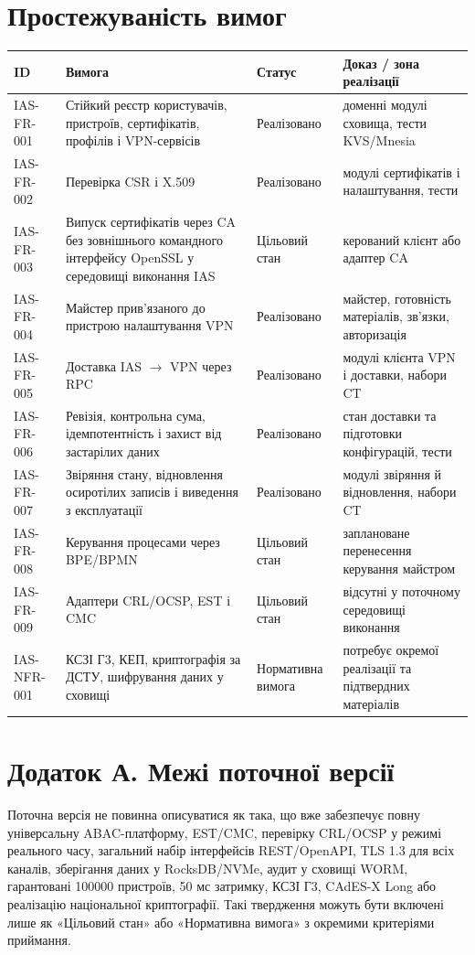 \documentclass{article}
\begin{document}
\section{Простежуваність вимог}
\begin{longtable}{p{2.3cm}p{5.4cm}p{2.2cm}p{4.1cm}}
\toprule
\textbf{ID} & \textbf{Вимога} & \textbf{Статус} & \textbf{Доказ / зона реалізації} \\
\midrule
IAS-FR-001 & Стійкий реєстр користувачів, пристроїв, сертифікатів, профілів і VPN-сервісів & Реалізовано & доменні модулі сховища, тести KVS/Mnesia \\
IAS-FR-002 & Перевірка CSR і X.509 & Реалізовано & модулі сертифікатів і налаштування, тести \\
IAS-FR-003 & Випуск сертифікатів через CA без зовнішнього командного інтерфейсу OpenSSL у середовищі виконання IAS & Цільовий стан & керований клієнт або адаптер CA \\
IAS-FR-004 & Майстер прив’язаного до пристрою налаштування VPN & Реалізовано & майстер, готовність матеріалів, зв’язки, авторизація \\
IAS-FR-005 & Доставка IAS $\rightarrow$ VPN через RPC & Реалізовано & модулі клієнта VPN і доставки, набори CT \\
IAS-FR-006 & Ревізія, контрольна сума, ідемпотентність і захист від застарілих даних & Реалізовано & стан доставки та підготовки конфігурацій, тести \\
IAS-FR-007 & Звіряння стану, відновлення осиротілих записів і виведення з експлуатації & Реалізовано & модулі звіряння й відновлення, набори CT \\
IAS-FR-008 & Керування процесами через BPE/BPMN & Цільовий стан & заплановане перенесення керування майстром \\
IAS-FR-009 & Адаптери CRL/OCSP, EST і CMC & Цільовий стан & відсутні у поточному середовищі виконання \\
IAS-NFR-001 & КСЗІ Г3, КЕП, криптографія за ДСТУ, шифрування даних у сховищі & Нормативна вимога & потребує окремої реалізації та підтвердних матеріалів \\
\bottomrule
\end{longtable}

\section{Додаток А. Межі поточної версії}
Поточна версія не повинна описуватися як така, що вже забезпечує повну універсальну ABAC-платформу, EST/CMC, перевірку CRL/OCSP у режимі реального часу, загальний набір інтерфейсів REST/OpenAPI, TLS 1.3 для всіх каналів, зберігання даних у RocksDB/NVMe, аудит у сховищі WORM, гарантовані 100000 пристроїв, 50 мс затримку, КСЗІ Г3, CAdES-X Long або реалізацію національної криптографії. Такі твердження можуть бути включені лише як «Цільовий стан» або «Нормативна вимога» з окремими критеріями приймання.
\end{document}
